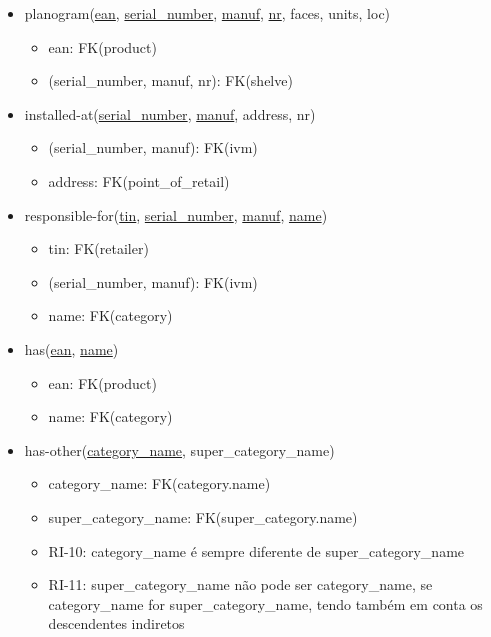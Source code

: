 \documentclass{article}
\newcommand{\bpoint}{\item[$\bullet$]}
\newenvironment{myitemize}
{ \begin{itemize}
    \setlength{\itemsep}{5pt}
    \setlength{\parskip}{0pt}
    \setlength{\parsep}{0pt}     }
{ \end{itemize}                  }
\begin{document}
\begin{myitemize}
\begin{myitemize}
		\end{myitemize}

        \pagebreak
		\vspace{2mm}

		\item[] planogram(\underline{ean}, \underline{serial\_number}, \underline{manuf}, \underline{nr}, faces, units, loc)
		\begin{myitemize}
			\bpoint ean: FK(product)
			\bpoint (serial\_number, manuf, nr): FK(shelve)
		\end{myitemize}

		\vspace{2mm}

		\item[] installed-at(\underline{serial\_number}, \underline{manuf}, address, nr)
		\begin{myitemize}
			\bpoint (serial\_number, manuf): FK(ivm)
			\bpoint address: FK(point\_of\_retail)
		\end{myitemize}

		\vspace{2mm}

		\item[] responsible-for(\underline{tin}, \underline{serial\_number}, \underline{manuf}, \underline{name})
		\begin{myitemize}
		    \bpoint tin: FK(retailer)
			\bpoint (serial\_number, manuf): FK(ivm)
			\bpoint name: FK(category)
		\end{myitemize}

		\vspace{2mm}

		\item[] has(\underline{ean}, \underline{name})
		\begin{myitemize}
			\bpoint ean: FK(product)
			\bpoint name: FK(category)
		\end{myitemize}

		\vspace{2mm}

		\item[] has-other(\underline{category\_name}, super\_category\_name)
		\begin{myitemize}
			\bpoint category\_name: FK(category.name)
			\bpoint super\_category\_name: FK(super\_category.name)
			\bpoint RI-10: category\_name é sempre diferente de super\_category\_name
			\bpoint RI-11: super\_category\_name não pode ser category\_name, se category\_name for super\_category\_name, tendo também em conta os descendentes indiretos

		\end{myitemize}

		\vspace{5mm}


	\end{myitemize}
\end{document}
